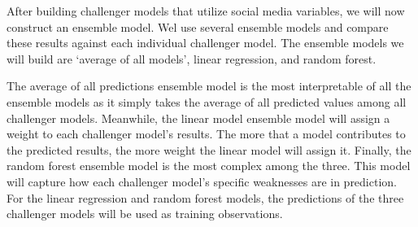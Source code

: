 \documentclass[12pt,oneside]{chicagocapstone}
\begin{document}
After building challenger models that utilize social media variables, we will now construct an ensemble model. Wel use several ensemble models and compare these results against each individual challenger model. The ensemble models we will build are `average of all models', linear regression, and random forest.

The average of all predictions ensemble model is the most interpretable of all the ensemble models as it simply takes the average of all predicted values among all challenger models. Meanwhile, the linear model ensemble model will assign a weight to each challenger model's results. The more that a model contributes to the predicted results, the more weight the linear model will assign it. Finally, the random forest ensemble model is the most complex among the three. This model will capture how each challenger model's specific weaknesses are in prediction. For the linear regression and random forest models, the predictions of the three challenger models will be used as training observations.
\end{document}
